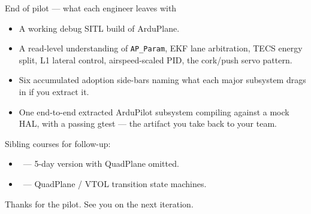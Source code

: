 \documentclass[aspectratio=169,11pt]{beamer}
\begin{document}
\begin{frame}{End of pilot --- what each engineer leaves with}
  \begin{itemize}
    \item A working debug SITL build of ArduPlane.
    \item A read-level understanding of \texttt{AP\_Param}, EKF lane arbitration, TECS energy split, L1 lateral control, airspeed-scaled PID, the cork/push servo pattern.
    \item Six accumulated adoption side-bars naming what each major subsystem drags in if you extract it.
    \item One end-to-end extracted ArduPilot subsystem compiling against a mock HAL, with a passing gtest --- the artifact you take back to your team.
  \end{itemize}
  \vfill
  Sibling courses for follow-up:
  \begin{itemize}
    \item \siblingplane\ --- 5-day version with QuadPlane omitted.
    \item \siblingquadplane\ --- QuadPlane / VTOL transition state machines.
  \end{itemize}
  \vfill
  \begin{center}\large Thanks for the pilot. See you on the next iteration.\end{center}
\end{frame}
\end{document}
